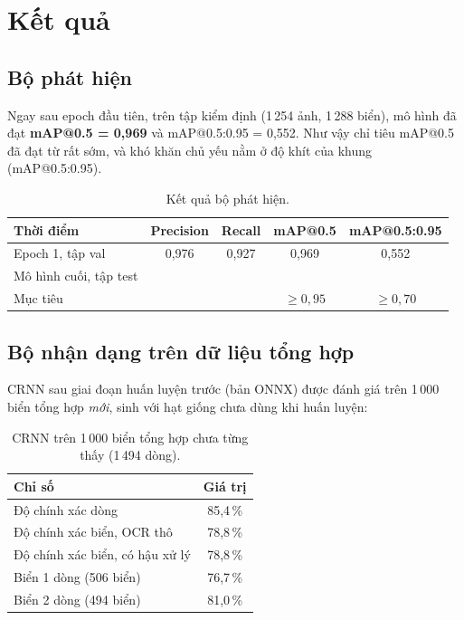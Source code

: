 \section{Kết quả}

\subsection{Bộ phát hiện}
Ngay sau epoch đầu tiên, trên tập kiểm định (1\,254 ảnh, 1\,288 biển), mô hình đã đạt \textbf{mAP@0.5 = 0,969} và mAP@0.5:0.95 = 0,552. Như vậy chỉ tiêu mAP@0.5 đã đạt từ rất sớm, và khó khăn chủ yếu nằm ở độ khít của khung (mAP@0.5:0.95).

\begin{table}[H]
\centering
\caption{Kết quả bộ phát hiện.}
\label{tab:det}
\begin{tabular}{lcccc}
\toprule
Thời điểm & Precision & Recall & mAP@0.5 & mAP@0.5:0.95 \\
\midrule
Epoch 1, tập val & 0,976 & 0,927 & 0,969 & 0,552 \\
Mô hình cuối, tập test & \todo{?} & \todo{?} & \todo{?} & \todo{?} \\
\midrule
Mục tiêu & & & $\geq 0{,}95$ & $\geq 0{,}70$ \\
\bottomrule
\end{tabular}
\end{table}

\subsection{Bộ nhận dạng trên dữ liệu tổng hợp}
CRNN sau giai đoạn huấn luyện trước (bản ONNX) được đánh giá trên 1\,000 biển tổng hợp \emph{mới}, sinh với hạt giống chưa dùng khi huấn luyện:

\begin{table}[H]
\centering
\caption{CRNN trên 1\,000 biển tổng hợp chưa từng thấy (1\,494 dòng).}
\label{tab:synth}
\begin{tabular}{lc}
\toprule
Chỉ số & Giá trị \\
\midrule
Độ chính xác dòng & 85,4\,\% \\
Độ chính xác biển, OCR thô & 78,8\,\% \\
Độ chính xác biển, có hậu xử lý & 78,8\,\% \\
\quad Biển 1 dòng (506 biển) & 76,7\,\% \\
\quad Biển 2 dòng (494 biển) & 81,0\,\% \\
\bottomrule
\end{tabular}
\end{table}

